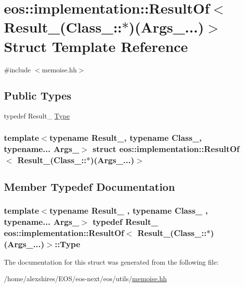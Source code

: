 \hypertarget{structeos_1_1implementation_1_1ResultOf_3_01Result___07Class___1_1_5_08_07Args___8_8_8_08_4}{
\section{eos::implementation::ResultOf$<$ Result\_\-(Class\_\-::$\ast$)(Args\_\-...)$>$ Struct Template Reference}
\label{structeos_1_1implementation_1_1ResultOf_3_01Result___07Class___1_1_5_08_07Args___8_8_8_08_4}
}


{\ttfamily \#include $<$memoise.hh$>$}\subsection*{Public Types}
\begin{DoxyCompactItemize}
\item 
typedef Result\_\- \hyperlink{structeos_1_1implementation_1_1ResultOf_3_01Result___07Class___1_1_5_08_07Args___8_8_8_08_4_ab09033492b872695f968f4eb92917df3}{Type}
\end{DoxyCompactItemize}
\subsubsection*{template$<$typename Result\_\-, typename Class\_\-, typename... Args\_\-$>$ struct eos::implementation::ResultOf$<$ Result\_\-(Class\_\-::$\ast$)(Args\_\-...)$>$}



\subsection{Member Typedef Documentation}
\hypertarget{structeos_1_1implementation_1_1ResultOf_3_01Result___07Class___1_1_5_08_07Args___8_8_8_08_4_ab09033492b872695f968f4eb92917df3}{
\subsubsection[{Type}]{\setlength{\rightskip}{0pt plus 5cm}template$<$typename Result\_\- , typename Class\_\- , typename... Args\_\-$>$ typedef Result\_\- eos::implementation::ResultOf$<$ Result\_\-(Class\_\-::$\ast$)(Args\_\-...)$>$::{\bf Type}}}
\label{structeos_1_1implementation_1_1ResultOf_3_01Result___07Class___1_1_5_08_07Args___8_8_8_08_4_ab09033492b872695f968f4eb92917df3}


The documentation for this struct was generated from the following file:\begin{DoxyCompactItemize}
\item 
/home/alexshires/EOS/eos-\/next/eos/utils/\hyperlink{memoise_8hh}{memoise.hh}\end{DoxyCompactItemize}
